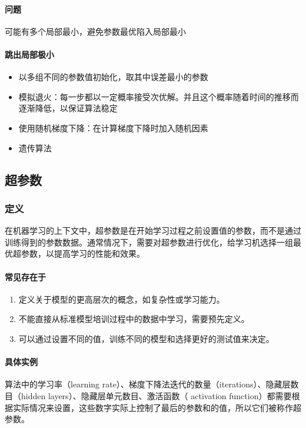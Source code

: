 \documentclass[UTF8]{ctexart}
\begin{document}
\paragraph{问题}
可能有多个局部最小，避免参数最优陷入局部最小
\paragraph{跳出局部极小}
\begin{itemize}
	\item 以多组不同的参数值初始化，取其中误差最小的参数
	\item 模拟退火：每一步都以一定概率接受次优解。并且这个概率随着时间的推移而逐渐降低，以保证算法稳定
	\item 使用随机梯度下降：在计算梯度下降时加入随机因素
	\item 遗传算法
\end{itemize}

\subsection{超参数}
\subsubsection{定义}
在机器学习的上下文中，超参数是在开始学习过程之前设置值的参数，而不是通过训练得到的参数数据。通常情况下，需要对超参数进行优化，给学习机选择一组最优超参数，以提高学习的性能和效果。
\paragraph{常见存在于}
\begin{enumerate}
	\item 定义关于模型的更高层次的概念，如复杂性或学习能力。
	\item 不能直接从标准模型培训过程中的数据中学习，需要预先定义。
	\item 可以通过设置不同的值，训练不同的模型和选择更好的测试值来决定。
\end{enumerate}
\paragraph{具体实例}
算法中的学习率（learning rate）、梯度下降法迭代的数量（iterations）、隐藏层数目（hidden layers）、隐藏层单元数目、激活函数（ activation function）都需要根据实际情况来设置，这些数字实际上控制了最后的参数和的值，所以它们被称作超参数。
\end{document}
